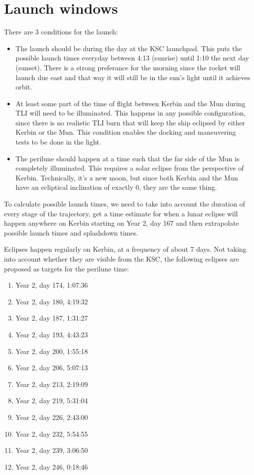 \documentclass[11pt, a4paper]{article}
\begin{document}
\section{Launch windows}

There are 3 conditions for the launch:
\begin{itemize}
\item The launch should be during the day at the KSC launchpad. This
  puts the possible launch times everyday between 4:13 (sunrise) until
  1:10 the next day (sunset). There is a strong preferance for the
  morning since the rocket will launch due east and that way it will
  still be in the sun's light until it achieves orbit.
\item At least some part of the time of flight between Kerbin and the
  Mun during TLI will need to be illuminated. This happens in any
  possible configuration, since there is no realistic TLI burn that
  will keep the ship eclipsed by either Kerbin or the Mun. This
  condition enables the docking and maneuvering tests to be done in
  the light.
\item The perilune should happen at a time such that the far side of
  the Mun is completely illuminated. This requires a solar
  eclipse from the perspective of Kerbin. Technically, it's a new
  moon, but since both Kerbin and the Mun have an ecliptical
  inclination of exactly 0, they are the same thing.
\end{itemize}

To calculate possible launch times, we need to take into account the
duration of every stage of the trajectory, get a time estimate for
when a lunar eclipse will happen anywhere on Kerbin starting on Year
2, day 167 and then extrapolate possible launch times and splashdown
times.

Eclipses happen regularly on Kerbin, at a frequency of about 7
days. Not taking into account whether they are visible from the KSC,
the following eclipses are proposed as targets for the perilune time:

\begin{enumerate}
\item Year 2, day 174, 1:07:36
\item Year 2, day 180, 4:19:32
\item Year 2, day 187, 1:31:27
\item Year 2, day 193, 4:43:23
\item Year 2, day 200, 1:55:18
\item Year 2, day 206, 5:07:13
\item Year 2, day 213, 2:19:09
\item Year 2, day 219, 5:31:04
\item Year 2, day 226, 2:43:00
\item Year 2, day 232, 5:54:55
\item Year 2, day 239, 3:06:50
\item Year 2, day 246, 0:18:46
\end{enumerate}
\end{document}
